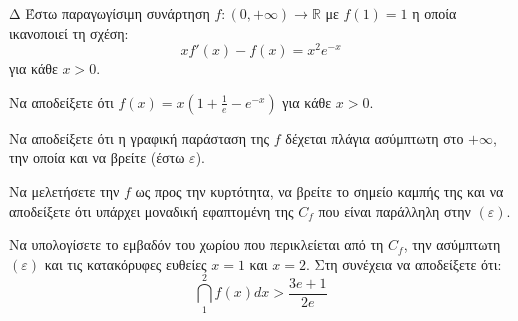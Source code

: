 \begin{thema}{Δ}
Έστω παραγωγίσιμη συνάρτηση $f: (0,+\infty) \to \mathbb{R}$ με $f(1)=1$ η οποία ικανοποιεί τη σχέση:
\[ x f'(x) - f(x) = x^2 e^{-x} \]
για κάθε $x>0$.
\begin{erwthma}
    \item Να αποδείξετε ότι $\displaystyle f(x) = x \left(1 + \frac{1}{e} - e^{-x}\right)$ για κάθε $x>0$.
    \item Να αποδείξετε ότι η γραφική παράσταση της $f$ δέχεται πλάγια ασύμπτωτη στο $+\infty$, την οποία και να βρείτε (έστω $\varepsilon$).
    \item Να μελετήσετε την $f$ ως προς την κυρτότητα, να βρείτε το σημείο καμπής της και να αποδείξετε ότι υπάρχει μοναδική εφαπτομένη της $C_f$ που είναι παράλληλη στην $(\varepsilon)$.
    \item Να υπολογίσετε το εμβαδόν του χωρίου που περικλείεται από τη $C_f$, την ασύμπτωτη $(\varepsilon)$ και τις κατακόρυφες ευθείες $x=1$ και $x=2$. Στη συνέχεια να αποδείξετε ότι:
    \[ \dint_1^2 f(x) dx > \frac{3e+1}{2e} \]
\end{erwthma}
\end{thema}
